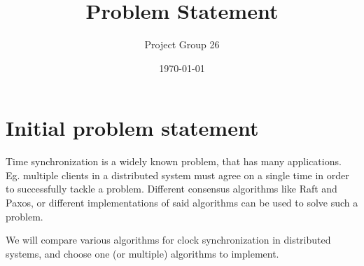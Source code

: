 \documentclass{article}
\title{Problem Statement}
\author{Project Group 26}
\date{\today}
\begin{document}
\maketitle

\section{Initial problem statement}

Time synchronization is a widely known problem, that has many applications. Eg. multiple clients in a distributed system must agree on a single time in order to successfully tackle a problem. Different consensus algorithms like Raft and Paxos, or different implementations of said algorithms can be used to solve such a problem.

We will compare various algorithms for clock synchronization in distributed systems, and choose one (or multiple) algorithms to implement.
\end{document}

